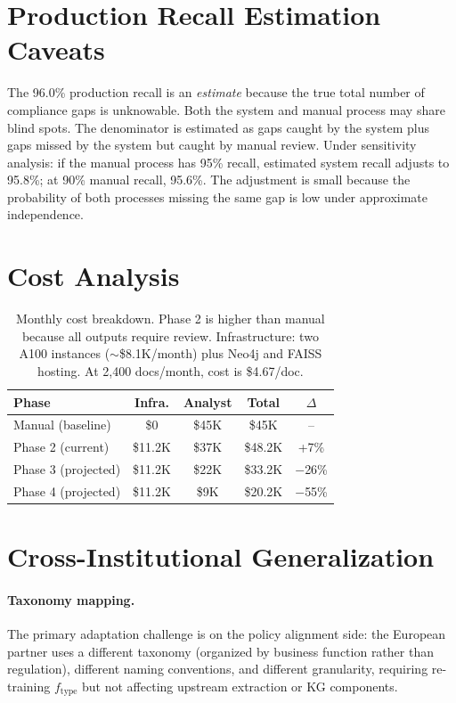 \documentclass[11pt]{article}
\begin{document}
\section{Production Recall Estimation Caveats}
\label{app:recall_caveats}

The 96.0\% production recall is an \emph{estimate} because the true total number of compliance gaps is unknowable. Both the system and manual process may share blind spots. The denominator is estimated as gaps caught by the system plus gaps missed by the system but caught by manual review. Under sensitivity analysis: if the manual process has 95\% recall, estimated system recall adjusts to 95.8\%; at 90\% manual recall, 95.6\%. The adjustment is small because the probability of both processes missing the same gap is low under approximate independence.


\section{Cost Analysis}
\label{app:cost}

\begin{table}[h]
\centering
\small
\begin{tabular}{@{}lcccc@{}}
\toprule
\textbf{Phase} & \textbf{Infra.} & \textbf{Analyst} & \textbf{Total} & \textbf{$\Delta$} \\
\midrule
Manual (baseline) & \$0 & \$45K & \$45K & -- \\
Phase 2 (current) & \$11.2K & \$37K & \$48.2K & +7\% \\
Phase 3 (projected) & \$11.2K & \$22K & \$33.2K & $-$26\% \\
Phase 4 (projected) & \$11.2K & \$9K & \$20.2K & $-$55\% \\
\bottomrule
\end{tabular}
\caption{Monthly cost breakdown. Phase 2 is higher than manual because all outputs require review. Infrastructure: two A100 instances ($\sim$\$8.1K/month) plus Neo4j and FAISS hosting. At 2,400 docs/month, cost is \$4.67/doc.}
\label{tab:cost}
\end{table}


\section{Cross-Institutional Generalization}
\label{app:generalization}

\paragraph{Taxonomy mapping.} The primary adaptation challenge is on the policy alignment side: the European partner uses a different taxonomy (organized by business function rather than regulation), different naming conventions, and different granularity, requiring re-training $f_{\text{type}}$ but not affecting upstream extraction or KG components.
\end{document}
